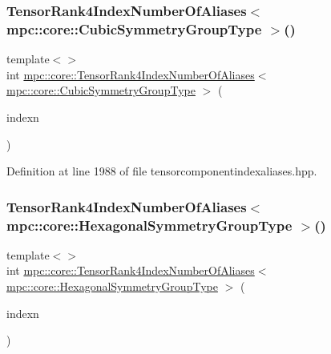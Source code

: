 \subsubsection{\texorpdfstring{Tensor\+Rank4\+Index\+Number\+Of\+Aliases$<$ mpc\+::core\+::\+Cubic\+Symmetry\+Group\+Type $>$()}{TensorRank4IndexNumberOfAliases< mpc::core::CubicSymmetryGroupType >()}}
{\footnotesize\ttfamily template$<$$>$ \\
int \mbox{\hyperlink{namespacempc_1_1core_a8d98ed039053b282c6ce8cff2fad214c}{mpc\+::core\+::\+Tensor\+Rank4\+Index\+Number\+Of\+Aliases}}$<$ \mbox{\hyperlink{structmpc_1_1core_1_1_cubic_symmetry_group_type}{mpc\+::core\+::\+Cubic\+Symmetry\+Group\+Type}} $>$ (\begin{DoxyParamCaption}\item[{const \mbox{\hyperlink{classmpc_1_1core_1_1_tensor_rank_n_component_index}{mpc\+::core\+::\+Tensor\+Rank\+N\+Component\+Index}}$<$ 4 $>$ \&}]{indexn }\end{DoxyParamCaption})\hspace{0.3cm}{\ttfamily [inline]}}



Definition at line 1988 of file tensorcomponentindexaliases.\+hpp.

\mbox{\label{namespacempc_1_1core_acced519e371dd13b347144a098e4b34f}} 
\subsubsection{\texorpdfstring{Tensor\+Rank4\+Index\+Number\+Of\+Aliases$<$ mpc\+::core\+::\+Hexagonal\+Symmetry\+Group\+Type $>$()}{TensorRank4IndexNumberOfAliases< mpc::core::HexagonalSymmetryGroupType >()}}
{\footnotesize\ttfamily template$<$$>$ \\
int \mbox{\hyperlink{namespacempc_1_1core_a8d98ed039053b282c6ce8cff2fad214c}{mpc\+::core\+::\+Tensor\+Rank4\+Index\+Number\+Of\+Aliases}}$<$ \mbox{\hyperlink{structmpc_1_1core_1_1_hexagonal_symmetry_group_type}{mpc\+::core\+::\+Hexagonal\+Symmetry\+Group\+Type}} $>$ (\begin{DoxyParamCaption}\item[{const \mbox{\hyperlink{classmpc_1_1core_1_1_tensor_rank_n_component_index}{mpc\+::core\+::\+Tensor\+Rank\+N\+Component\+Index}}$<$ 4 $>$ \&}]{indexn }\end{DoxyParamCaption})\hspace{0.3cm}{\ttfamily [inline]}}



